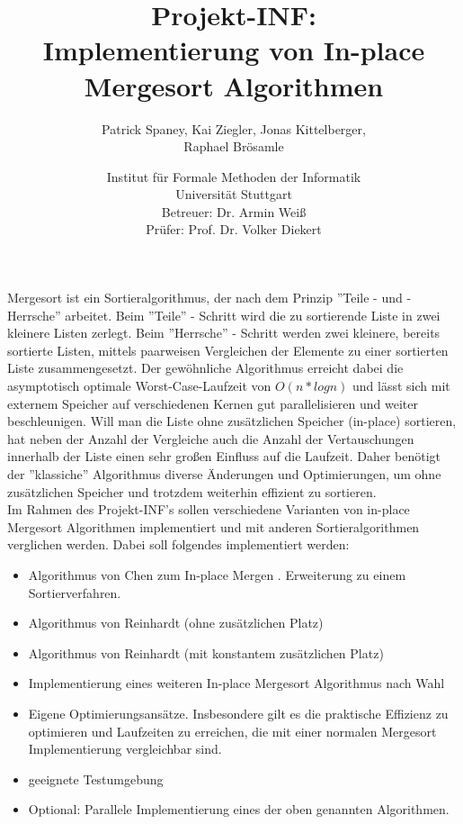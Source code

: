 \documentclass[12pt,pdftex,a4paper]{article}
\begin{document}
\title{Projekt-INF:\\
Implementierung von In-place Mergesort Algorithmen}
\author{Patrick Spaney, Kai Ziegler, Jonas Kittelberger, \\ Raphael Brösamle}
\date{Institut für Formale Methoden der Informatik \\ Universität Stuttgart\\
\normalsize Betreuer: Dr. Armin Weiß\\
Prüfer: Prof. Dr. Volker Diekert}
\maketitle
Mergesort ist ein Sortieralgorithmus, der nach dem Prinzip ''Teile - und - Herrsche'' arbeitet. Beim ''Teile'' - Schritt wird die zu
sortierende Liste in zwei kleinere Listen zerlegt. Beim ''Herrsche'' - Schritt werden zwei kleinere, bereits sortierte Listen,
mittels paarweisen Vergleichen der Elemente zu einer sortierten Liste zusammengesetzt.
Der gewöhnliche Algorithmus erreicht dabei die asymptotisch optimale Worst-Case-Laufzeit von $O(n*logn)$ und
lässt sich mit externem Speicher auf verschiedenen Kernen gut parallelisieren und weiter beschleunigen.
Will man die Liste ohne zusätzlichen Speicher (in-place) sortieren, hat neben der Anzahl der Vergleiche
auch die Anzahl der Vertauschungen innerhalb der Liste einen sehr großen Einfluss auf die Laufzeit.
Daher benötigt der ''klassiche'' Algorithmus diverse Änderungen und Optimierungen, um ohne
zusätzlichen Speicher und trotzdem weiterhin effizient zu sortieren. \vspace*{5mm} \\
Im Rahmen des Projekt-INF's sollen verschiedene Varianten von in-place Mergesort Algorithmen implementiert und mit anderen Sortieralgorithmen verglichen werden.
Dabei soll folgendes implementiert werden:
\begin{itemize}
\item Algorithmus von Chen zum In-place Mergen \cite{Chen06}. Erweiterung zu einem Sortierverfahren. 
\item Algorithmus von Reinhardt \cite{Reinhardt92} (ohne zusätzlichen Platz)
\item Algorithmus von Reinhardt (mit konstantem zusätzlichen Platz)
\item Implementierung eines weiteren In-place Mergesort Algorithmus nach Wahl
\item Eigene Optimierungsansätze. Insbesondere gilt es die praktische Effizienz zu optimieren und Laufzeiten zu erreichen, die mit einer normalen Mergesort Implementierung vergleichbar sind. 
\item geeignete Testumgebung
\item Optional: Parallele Implementierung eines der oben genannten Algorithmen.
\end{itemize}
\end{document}
